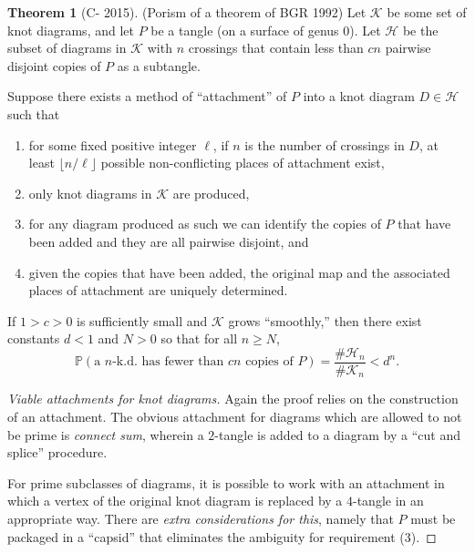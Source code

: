 \documentclass[12pt]{amsart}
\newcommand{\Prb}{\mathbb{P}}
\theoremstyle{definition}
\newtheorem*{theorem}{Theorem}
\theoremstyle{plain}
\begin{document}
\vspace{1in}

\newcommand{\KnotShad}{\mathcal{K}}
\newcommand{\KDefShad}{\mathcal{H}}

\begin{theorem}[C- 2015]
  (Porism of a theorem of BGR 1992) Let $\KnotShad$ be some set of
  knot diagrams, and let $P$ be a tangle (on a surface of genus
  0). Let $\KDefShad$ be the subset of diagrams in $\KnotShad$ with
  $n$ crossings that contain less than $cn$ pairwise disjoint copies
  of $P$ as a subtangle.

  Suppose there exists a method of ``attachment'' of $P$ into a knot
  diagram $D \in \KDefShad$ such that
  \begin{enumerate}
  \item for some fixed positive integer $\ell$, if $n$ is the number
    of crossings in $D$, at least $\lfloor
    n/\ell \rfloor$ possible non-conflicting places of attachment
    exist,
  \item only knot diagrams in $\KnotShad$ are produced,
  \item for any diagram produced as such we can identify the copies of
    $P$ that have been added and they are all pairwise disjoint, and
  \item given the copies that have been added, the original map and
    the associated places of attachment are uniquely determined.
  \end{enumerate}
  If $1 > c > 0$ is sufficiently small and $\KnotShad$ grows
  ``smoothly,'' then there exist constants $d < 1$ and $N > 0$ so that
  for all $n \ge N$,
  \[ \Prb(\text{a $n$-k.d. has fewer than $cn$ copies of $P$}) = \frac{\#\KDefShad_n}{\#\KnotShad_n} < d^n.\]
\end{theorem}

\begin{proof}[Viable attachments for knot diagrams]
  Again the proof relies on the construction of an attachment. The
  obvious attachment for diagrams which are allowed to not be prime is
  \emph{connect sum}, wherein a $2$-tangle is added to a diagram by a
  ``cut and splice'' procedure.
  \vspace{1in}

  For prime subclasses of diagrams, it is possible to work with an
  attachment in which a vertex of the original knot diagram is
  replaced by a $4$-tangle in an appropriate way. There are
  \emph{extra considerations for this}, namely that $P$ must be
  packaged in a ``capsid'' that eliminates the ambiguity for
  requirement (3).
  \vspace{1in}

\end{proof}
\end{document}

